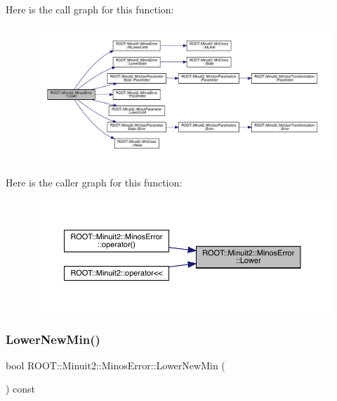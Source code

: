Here is the call graph for this function\+:
\nopagebreak
\begin{figure}[H]
\begin{center}
\leavevmode
\includegraphics[width=350pt]{d2/dd1/classROOT_1_1Minuit2_1_1MinosError_ac412aab9b0a59a427fbe7e3cfad47f0c_cgraph}
\end{center}
\end{figure}
Here is the caller graph for this function\+:
\nopagebreak
\begin{figure}[H]
\begin{center}
\leavevmode
\includegraphics[width=350pt]{d2/dd1/classROOT_1_1Minuit2_1_1MinosError_ac412aab9b0a59a427fbe7e3cfad47f0c_icgraph}
\end{center}
\end{figure}
\mbox{\label{classROOT_1_1Minuit2_1_1MinosError_a9a806056992d1acb26420bf4895b46e9}} 
\subsubsection{\texorpdfstring{LowerNewMin()}{LowerNewMin()}\hspace{0.1cm}{\footnotesize\ttfamily [1/3]}}
{\footnotesize\ttfamily bool R\+O\+O\+T\+::\+Minuit2\+::\+Minos\+Error\+::\+Lower\+New\+Min (\begin{DoxyParamCaption}{ }\end{DoxyParamCaption}) const\hspace{0.3cm}{\ttfamily [inline]}}

